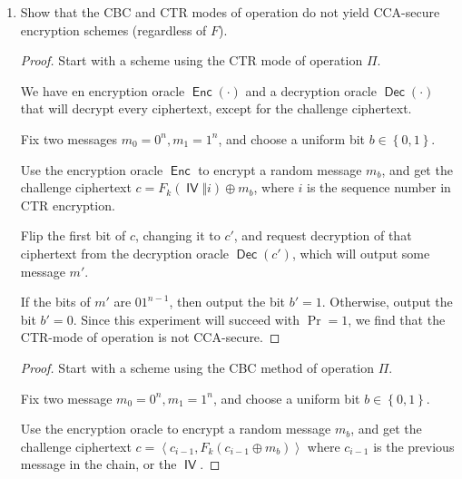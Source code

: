 \documentclass{article}
\DeclareMathOperator{\Enc}{\textsf{Enc}}
\DeclareMathOperator{\Dec}{\textsf{Dec}}
\DeclareMathOperator{\IV}{\textsf{IV}}
\begin{document}
\begin{enumerate}
\begin{enumerate}
\begin{proof}
            Since every message is CPA-secure, over multiple messages, the
            scheme is CPA-secure, which is a stronger guarantee than
            EAV-security.
          \end{proof}
    \end{enumerate}
  \item Show that the CBC and CTR modes of operation do not yield CCA-secure
    encryption schemes (regardless of $F$).


    \begin{proof}
      Start with a scheme using the CTR mode of operation $\Pi$.

      We have en encryption oracle $\Enc(\cdot)$ and a decryption oracle
      $\Dec(\cdot)$ that will decrypt every ciphertext, except for the challenge
      ciphertext.

      Fix two messages $m_0 = 0^n, m_1 = 1^n$, and choose a uniform bit $b \in
      \left\{0, 1\right\}$.

      Use the encryption oracle $\Enc$ to encrypt a random message $m_b$, and
      get the challenge ciphertext $c = F_k(\IV \Vert i) \oplus m_b$, where $i$
      is the sequence number in CTR encryption.

      Flip the first bit of $c$, changing it to $c'$, and request decryption of
      that ciphertext from the decryption oracle $\Dec(c')$, which will output
      some message $m'$.

      If the bits of $m'$ are $0 1^{n - 1}$, then output the bit $b' = 1$.
      Otherwise, output the bit $b' = 0$. Since this experiment will succeed
      with $\Pr = 1$, we find that the CTR-mode of operation is not CCA-secure.
    \end{proof}


    \begin{proof}
      Start with a scheme using the CBC method of operation $\Pi$.

      Fix two message $m_0 = 0^n, m_1 = 1^n$, and choose a uniform bit $b \in
      \left\{0, 1\right\}$.

      Use the encryption oracle to encrypt a random message $m_b$, and get the
      challenge ciphertext $c = \left\langle c_{i - 1}, F_k(c_{i - 1} \oplus
      m_b)\right\rangle $ where $c_{i - 1}$ is
      the previous message in the chain, or the $\IV$.


\end{proof}
\end{enumerate}
\end{document}
